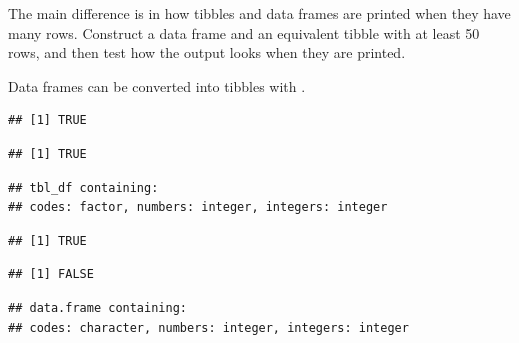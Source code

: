 \documentclass[krantz2,ChapterTOCs]{krantz}\usepackage{knitr}
\begin{document}
\begin{playground}
The main difference is in how tibbles and data frames are printed when they have many rows. Construct a data frame and an equivalent tibble with at least 50 rows, and then test how the output looks when they are printed.
\end{playground}

Data frames can be converted into tibbles with .

\begin{knitrout}\footnotesize
{}\color{fgcolor}\begin{kframe}
\begin{alltt}
 \hlkwb{<-} 
\end{alltt}
\begin{verbatim}
## [1] TRUE
\end{verbatim}
\begin{alltt}
\end{alltt}
\begin{verbatim}
## [1] TRUE
\end{verbatim}
\begin{alltt}
\end{alltt}
\begin{verbatim}
## tbl_df containing:
## codes: factor, numbers: integer, integers: integer
\end{verbatim}
\end{kframe}
\end{knitrout}

\begin{knitrout}\footnotesize
{}\color{fgcolor}\begin{kframe}
\begin{alltt}
 \hlkwb{<-} 
\end{alltt}
\begin{verbatim}
## [1] TRUE
\end{verbatim}
\begin{alltt}
\end{alltt}
\begin{verbatim}
## [1] FALSE
\end{verbatim}
\begin{alltt}
\end{alltt}
\begin{verbatim}
## data.frame containing:
## codes: character, numbers: integer, integers: integer
\end{verbatim}
\end{kframe}
\end{knitrout}
\end{document}
